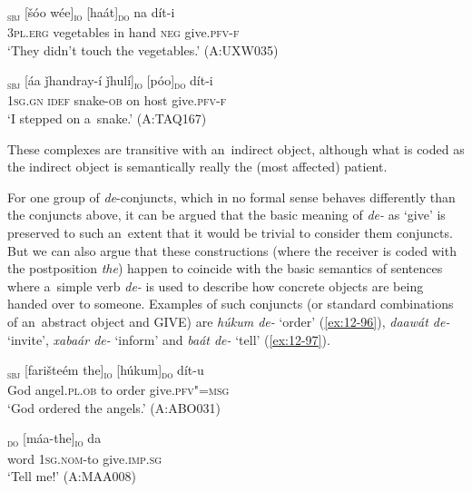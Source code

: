 \begin{exe}
\ex
\label{ex:12-94}
\gll [taním]\textsubscript{\textsc{sbj}} [šóo wée]\textsubscript{\textsc{io}} [haát]\textsubscript{\textsc{do}} na dít-i \\
\textsc{3pl.erg} vegetables in hand \textsc{neg} give.\textsc{pfv-f} \\
\glt `They didn't touch the vegetables.' (A:UXW035)
\end{exe}
\begin{exe}
\ex
\label{ex:12-95}
\gll [míi]\textsubscript{\textsc{sbj}} [áa ǰhandray-í ǰhulí]\textsubscript{\textsc{io}} [póo]\textsubscript{\textsc{do}} dít-i  \\
\textsc{1sg.gn} \textsc{idef} snake-\textsc{ob} on host give.\textsc{pfv-f} \\
\glt `I stepped on a~snake.' (A:TAQ167)
\end{exe}

These complexes are transitive with an~indirect object, although what is coded as the indirect object is semantically really the (most affected) patient. 


 For one group of \textit{de}-conjuncts, which in no formal sense behaves differently than the conjuncts above, it can be argued that the basic meaning of \textit{de-} as `give' is preserved to such an~extent that it would be trivial to consider them conjuncts. But we can also argue that these constructions (where the receiver is coded with the postposition \textit{the}) happen to coincide with the basic semantics of sentences where a~simple verb \textit{de-} is used to describe how concrete objects are being handed over to someone. Examples of such conjuncts (or standard combinations of an~abstract object and GIVE) are \textit{húkum de-} `order' (\ref{ex:12-96}), \textit{daawát de-} `invite', \textit{xabaár de-} `inform' and \textit{baát de-} `tell' (\ref{ex:12-97}).

\begin{exe}
\ex
\label{ex:12-96}
\gll [alaahtaalaá]\textsubscript{\textsc{sbj}} [farišteém the]\textsubscript{\textsc{io}} [húkum]\textsubscript{\textsc{do}} dít-u \\
God angel.\textsc{pl.ob} to order  give.\textsc{pfv"=msg} \\
\glt `God ordered the angels.' (A:ABO031)
\end{exe}
\begin{exe}
\ex
\label{ex:12-97}
\gll [baát]\textsubscript{\textsc{do}} [máa-the]\textsubscript{\textsc{io}} da  \\
word \textsc{1sg.nom-}to give.\textsc{imp.sg} \\
\glt `Tell me!' (A:MAA008)
\end{exe}

